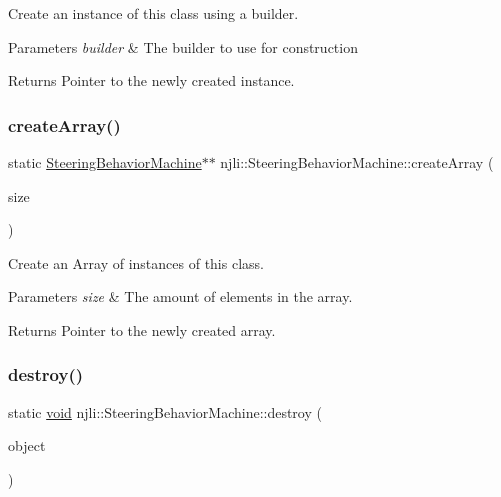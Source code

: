 Create an instance of this class using a builder.


\begin{DoxyParams}{Parameters}
{\em builder} & The builder to use for construction\\
\hline
\end{DoxyParams}
\begin{DoxyReturn}{Returns}
Pointer to the newly created instance. 
\end{DoxyReturn}
\mbox{\label{classnjli_1_1_steering_behavior_machine_af97628764337e956f6c6ffe1d21eff30}} 
\subsubsection{\texorpdfstring{create\+Array()}{createArray()}}
{\footnotesize\ttfamily static \mbox{\hyperlink{classnjli_1_1_steering_behavior_machine}{Steering\+Behavior\+Machine}}$\ast$$\ast$ njli\+::\+Steering\+Behavior\+Machine\+::create\+Array (\begin{DoxyParamCaption}\item[{const \mbox{\hyperlink{_util_8h_a10e94b422ef0c20dcdec20d31a1f5049}{u32}}}]{size }\end{DoxyParamCaption})\hspace{0.3cm}{\ttfamily [static]}}

Create an Array of instances of this class.


\begin{DoxyParams}{Parameters}
{\em size} & The amount of elements in the array.\\
\hline
\end{DoxyParams}
\begin{DoxyReturn}{Returns}
Pointer to the newly created array. 
\end{DoxyReturn}
\mbox{\label{classnjli_1_1_steering_behavior_machine_a7e50f455b9d1a543c98bcb463f312647}} 
\subsubsection{\texorpdfstring{destroy()}{destroy()}}
{\footnotesize\ttfamily static \mbox{\hyperlink{_thread_8h_af1e856da2e658414cb2456cb6f7ebc66}{void}} njli\+::\+Steering\+Behavior\+Machine\+::destroy (\begin{DoxyParamCaption}\item[{\mbox{\hyperlink{classnjli_1_1_steering_behavior_machine}{Steering\+Behavior\+Machine}} $\ast$}]{object }\end{DoxyParamCaption})\hspace{0.3cm}{\ttfamily [static]}}

